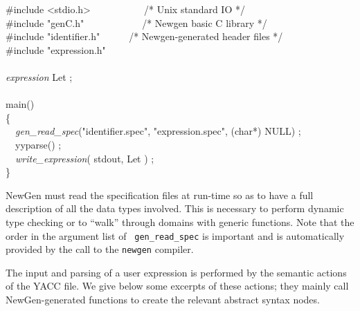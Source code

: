 \begin{pgm}
\#include <stdio.h>~~~~~~~~~~~/* Unix standard IO */\\
\#include "genC.h"~~~~~~~~~~~~/* Newgen basic C library */ \\
\#include "identifier.h"~~~~~~/* Newgen-generated header files */ \\
\#include "expression.h" \\
 \\
{\sl expression} Let ; \\
 \\
main() \\
\{ \\
~~{\sl gen\_read\_spec}("identifier.spec", "expression.spec", 
				(char*) NULL) ; \\
~~yyparse() ; \\
~~{\sl write\_expression}( stdout, Let ) ; \\
\}
\end{pgm}

NewGen must read the specification files at run-time so as to have a
full description of all the data types involved. This is necessary to
perform dynamic type checking or to ``walk'' through domains with
generic functions. Note that the order in the argument list of {\tt
gen\_read\_spec} is important and is automatically provided by the call
to the {\tt newgen} compiler.

The input and parsing of a user expression is performed by the semantic
actions of the YACC file. We give below some excerpts of these actions;
they mainly call NewGen-generated functions to create the relevant
abstract syntax nodes.

